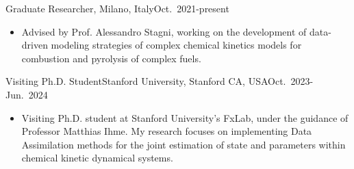 \begin{position}{Graduate Researcher}{\polimi, Milano, Italy}{Oct.~2021-present}
   \begin{itemize}
      \item[ ] Advised by Prof. Alessandro Stagni, working on the development of
         data-driven modeling strategies of complex chemical kinetics models for
         combustion and pyrolysis of complex fuels.
   \end{itemize}
\end{position}

\begin{position}{Visiting Ph.D. Student}{Stanford University, Stanford CA, USA}{Oct.~2023-Jun.~2024}
   \begin{itemize}
      \item[ ] Visiting Ph.D. student at Stanford University's FxLab, under the guidance of
         Professor Matthias Ihme. My research focuses on implementing Data Assimilation
         methods for the joint estimation of state and parameters within chemical kinetic
         dynamical systems.
   \end{itemize}
\end{position}
